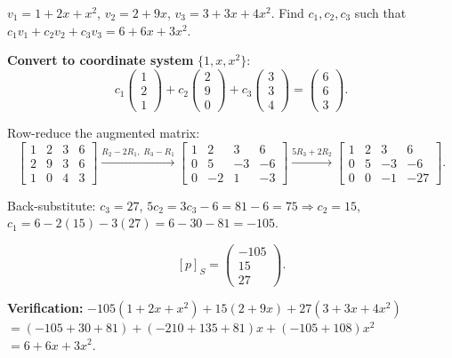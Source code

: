 \documentclass[12pt,a3paper]{article}
\begin{document}
\begin{tcolorbox}[enhanced,breakable,
  colback=cF!4,colframe=cF,boxrule=0.8pt,arc=5pt,
  title={\textbf{Answer --- Coordinate Vector of $6+6x+3x^2$ Relative to $S=\{v_1,v_2,v_3\}$}},
  fonttitle=\bfseries\color{white},colbacktitle=cF]

$v_1=1+2x+x^2$, $v_2=2+9x$, $v_3=3+3x+4x^2$. Find $c_1,c_2,c_3$ such that $c_1v_1+c_2v_2+c_3v_3=6+6x+3x^2$.

\textbf{Convert to coordinate system} $\{1,x,x^2\}$:
\[
c_1\begin{pmatrix}1\\2\\1\end{pmatrix}+c_2\begin{pmatrix}2\\9\\0\end{pmatrix}+c_3\begin{pmatrix}3\\3\\4\end{pmatrix}=\begin{pmatrix}6\\6\\3\end{pmatrix}.
\]

Row-reduce the augmented matrix:
\[
\left[\begin{array}{ccc|c}1&2&3&6\\2&9&3&6\\1&0&4&3\end{array}\right]
\xrightarrow{R_2-2R_1,\;R_3-R_1}
\left[\begin{array}{ccc|c}1&2&3&6\\0&5&-3&-6\\0&-2&1&-3\end{array}\right]
\xrightarrow{5R_3+2R_2}
\left[\begin{array}{ccc|c}1&2&3&6\\0&5&-3&-6\\0&0&-1&-27\end{array}\right].
\]

Back-substitute: $c_3=27$, $5c_2=3c_3-6=81-6=75\Rightarrow c_2=15$, $c_1=6-2(15)-3(27)=6-30-81=-105$.

\[
\boxed{[p]_S=\begin{pmatrix}-105\\15\\27\end{pmatrix}.}
\]

\textbf{Verification:}
$-105(1+2x+x^2)+15(2+9x)+27(3+3x+4x^2)$
$=(-105+30+81)+(-210+135+81)x+(-105+108)x^2$
$=6+6x+3x^2$. \checkmark

\end{tcolorbox}
\end{document}
